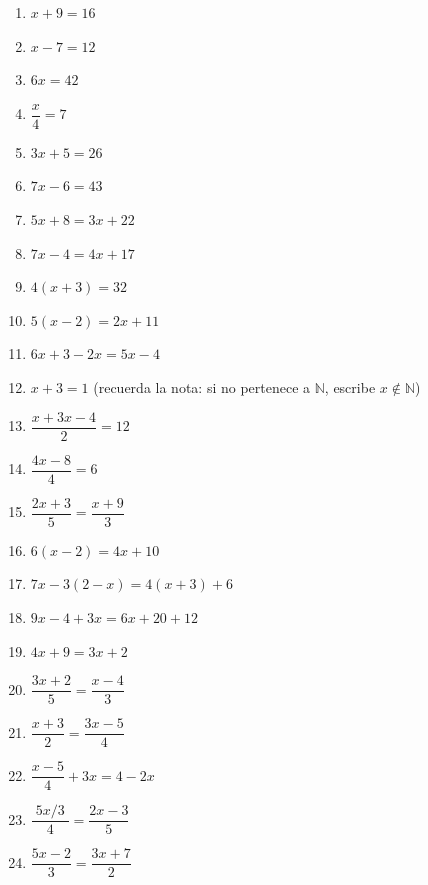 \documentclass[12pt, letterpaper]{article}
\newcommand{\N}{\mathbb{N}}
\begin{document}
\begin{enumerate}[leftmargin=*]
  \item \facil{} $x + 9 = 16$

  \item \facil{} $x - 7 = 12$

  \item \facil{} $6x = 42$

  \item \facil{} $\dfrac{x}{4} = 7$

  \item \facil{} $3x + 5 = 26$

  \item \facil{} $7x - 6 = 43$

  \item \medio{} $5x + 8 = 3x + 22$

  \item \medio{} $7x - 4 = 4x + 17$

  \item \medio{} $4(x + 3) = 32$

  \item \medio{} $5(x - 2) = 2x + 11$

  \item \medio{} $6x + 3 - 2x = 5x - 4$

  \item \medio{} $x + 3 = 1$ (recuerda la nota: si no pertenece a $\N$, escribe $x \notin \N$)

  \item \medio{} $\dfrac{x + 3x - 4}{2} = 12$

  \item \medio{} $\dfrac{4x - 8}{4} = 6$

  \item \medio{} $\dfrac{2x + 3}{5} = \dfrac{x + 9}{3}$

  \item \dificil{} $6(x - 2) = 4x + 10$

  \item \dificil{} $7x - 3(2 - x) = 4(x + 3) + 6$

  \item \dificil{} $9x - 4 + 3x = 6x + 20 + 12$

  \item \dificil{} $4x + 9 = 3x + 2$

  \item \dificil{} $\dfrac{3x + 2}{5} = \dfrac{x - 4}{3}$

  \item \dificil{} $\dfrac{x + 3}{2} = \dfrac{3x - 5}{4}$

  \item \dificil{} $\dfrac{x - 5}{4} + 3x = 4 - 2x$

  \item \dificil{} $\dfrac{\;5x/3\;}{4} = \dfrac{2x - 3}{5}$

  \item \dificil{} $\dfrac{5x - 2}{3} = \dfrac{3x + 7}{2}$
\end{enumerate}
\end{document}
